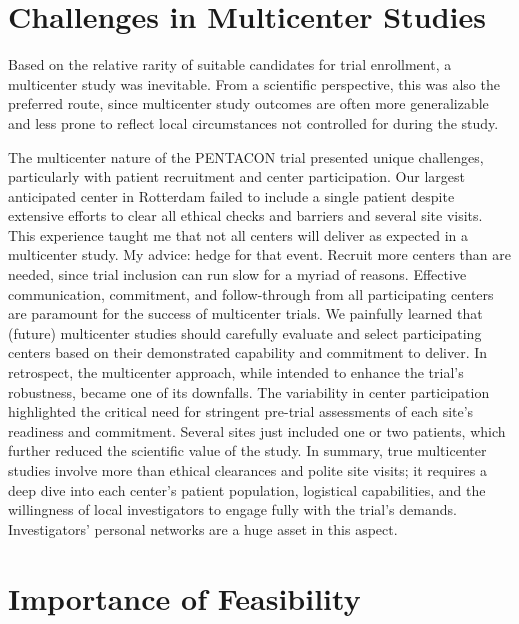 \documentclass[authordate, empirical]{jote-new-article}
\begin{document}
	\section{Challenges in Multicenter Studies}



	Based on the relative rarity of suitable candidates for trial enrollment, a multicenter study was inevitable. From a scientific perspective, this was also the preferred route, since multicenter study outcomes are often more generalizable and less prone to reflect local circumstances not controlled for during the study.



	The multicenter nature of the PENTACON trial presented unique challenges, particularly with patient recruitment and center participation. Our largest anticipated center in Rotterdam failed to include a single patient despite extensive efforts to clear all ethical checks and barriers and several site visits. This experience taught me that not all centers will deliver as expected in a multicenter study. My advice: hedge for that event. Recruit more centers than are needed, since trial inclusion can run slow for a myriad of reasons. Effective communication, commitment, and follow-through from all participating centers are paramount for the success of multicenter trials. We painfully learned that (future) multicenter studies should carefully evaluate and select participating centers based on their demonstrated capability and commitment to deliver. In retrospect, the multicenter approach, while intended to enhance the trial's robustness, became one of its downfalls. The variability in center participation highlighted the critical need for stringent pre-trial assessments of each site's readiness and commitment. Several sites just included one or two patients, which further reduced the scientific value of the study. In summary, true multicenter studies involve more than ethical clearances and polite site visits; it requires a deep dive into each center's patient population, logistical capabilities, and the willingness of local investigators to engage fully with the trial's demands. Investigators' personal networks are a huge asset in this aspect.



	\section{Importance of Feasibility }
\end{document}

